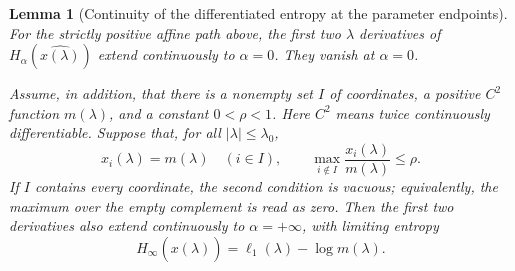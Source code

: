 \documentclass[aps,pra,11pt,onecolumn,nofootinbib,tightenlines]{revtex4-2}
\newtheorem{lemma}[theorem]{Lemma}
\theoremstyle{definition}
\begin{document}
\begin{lemma}[Continuity of the differentiated entropy at the parameter endpoints]
\label{lem:app-endpoint-differentiability}
For the strictly positive affine path above, the first two $\lambda$ derivatives of $H_\alpha(\widehat{x(\lambda)})$ extend continuously to $\alpha=0$.  They vanish at $\alpha=0$.

Assume, in addition, that there is a nonempty set $I$ of coordinates, a
positive $C^2$ function $m(\lambda)$, and a constant $0<\rho<1$.  Here $C^2$
means twice continuously differentiable.  Suppose that, for all
$|\lambda|\leq\lambda_0$,
\begin{equation}
 x_i(\lambda)=m(\lambda)\quad(i\in I),
 \qquad
 \max_{i\notin I}\frac{x_i(\lambda)}{m(\lambda)}\leq\rho.
 \label{eq:app-stable-max}
\end{equation}
If $I$ contains every coordinate, the second condition is vacuous; equivalently,
the maximum over the empty complement is read as zero.
Then the first two derivatives also extend continuously to $\alpha=+\infty$, with limiting entropy
\begin{equation}
 H_\infty(\widehat{x(\lambda)})
 =\ell_1(\lambda)-\log m(\lambda).
 \label{eq:app-H-infinity-path}
\end{equation}
\end{lemma}
\end{document}
